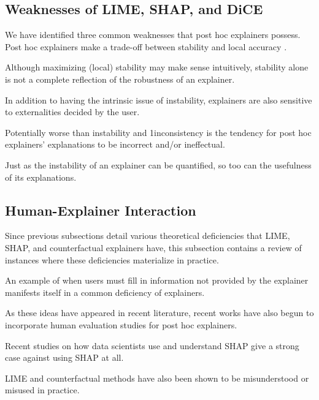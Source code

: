 \documentclass[mnsc,blindrev]{informs3}
\begin{document}
    \subsection{Weaknesses of LIME, SHAP, and DiCE}
        \label{sec:weaknesses}
        We have identified three common weaknesses that post hoc explainers possess.
        Post hoc explainers make a trade-off between stability and local accuracy \citep{alvarez18robustness, laugel18defining}. 
    

    Although maximizing (local) stability may make sense intuitively, stability alone is not a complete reflection of the robustness of an explainer. 

    In addition to having the intrinsic issue of instability, explainers are also sensitive to externalities decided by the user.
    
    Potentially worse than instability and 1inconsistency is the tendency for post hoc explainers' explanations to be incorrect and/or ineffectual.

    Just as the instability of an explainer can be quantified, so too can the usefulness of its explanations.
    
    \subsection{Human-Explainer Interaction}
        \label{sec:human_explainer_interaction}
        Since previous subsections detail various theoretical deficiencies that LIME, SHAP, and counterfactual explainers have, this subsection contains a review of instances where these deficiencies materialize in practice. 
        
        An example of when users must fill in information not provided by the explainer manifests itself in a common deficiency of explainers. 
        
        As these ideas have appeared in recent literature, recent works have also begun to incorporate human evaluation studies for post hoc explainers.
        
        Recent studies on how data scientists use and understand SHAP give a strong case against using SHAP at all. 

        LIME and counterfactual methods have also been shown to be misunderstood or misused in practice.
\end{document}
